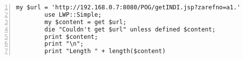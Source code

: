 

    \begin{lstlisting}[numbers=left, breaklines=true]
        my $url = 'http://192.168.0.7:8080/POG/getINDI.jsp?zarefno=a1.';
        use LWP::Simple;
        my $content = get $url;
        die "Couldn't get $url" unless defined $content;
        print $content;
        print "\n";
        print "Length " + length($content)
    \end{lstlisting}




